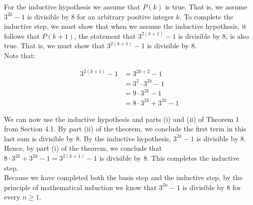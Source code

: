 \documentclass[11pt]{article}
\begin{document}
For the inductive hypothesis we assume that $P(k)$ is true. That is, we assume $3^{2k} - 1$ is divisible by $8$ for an arbitrary positive integer $k$. To complete the inductive step, we must show that when we assume the inductive hypothesis, it follows that $P(k + 1)$, the statement that $3^{2(k + 1)} - 1$ is divisible by $8$, is also true. That is, we must show that $3^{2(k + 1)} - 1$ is divisible by $8$.\\[\baselineskip]

Note that:

\begin{align*}
    3^{2(k + 1)} - 1 &= 3^{2k + 2} - 1 \\
    &= 3^2 \cdot 3^{2k} - 1 \\
    &= 9 \cdot 3^{2k} - 1 \\
    &= 8 \cdot 3^{2k} + 3^{2k} - 1
\end{align*}

We can now use the inductive hypothesis and parts (i) and (ii) of Theorem 1 from Section 4.1. By part (ii) of the theorem, we conclude the first term in this last sum is divisible by $8$. By the inductive hypothesis, $3^{2k} - 1$ is divisible by $8$. Hence, by part (i) of the theorem, we conclude that $8 \cdot 3^{2k} + 3^{2k} - 1 = 3^{2(k + 1)} - 1$ is divisible by $8$. This completes the inductive step.\\[\baselineskip]

Because we have completed both the basis step and the inductive step, by the principle of mathematical induction we know that $3^{2n} - 1$ is divisible by $8$ for every $n \geq 1$.
\end{document}
